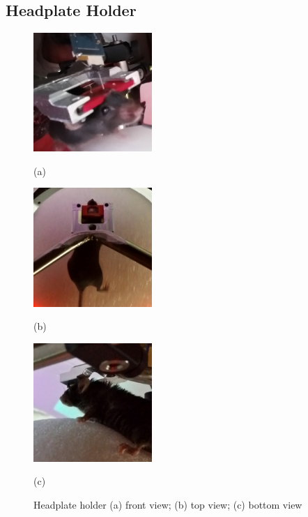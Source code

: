 \subsection{Headplate Holder}\label{headplate-holder}

\begin{figure}[htb]
  \begin{minipage}[t]{0.32\linewidth}\centering
    \includegraphics[width=4.5cm]{photo-front.jpg}
    \centerline{(a)}
  \end{minipage}\hfill
  \begin{minipage}[t]{0.32\linewidth}\centering
    \includegraphics[width=4.5cm]{photo-top.jpg}
        \centerline{(b)}
  \end{minipage}
  \begin{minipage}[t]{0.32\linewidth}\centering
    \includegraphics[width=4.5cm]{photo-bottom.jpg}
    \centerline{(c)}
  \end{minipage}
  \caption{Headplate holder (a) front view; (b) top view; (c) bottom view}
  \label{fig:Spherical treadmill}
\end{figure}






